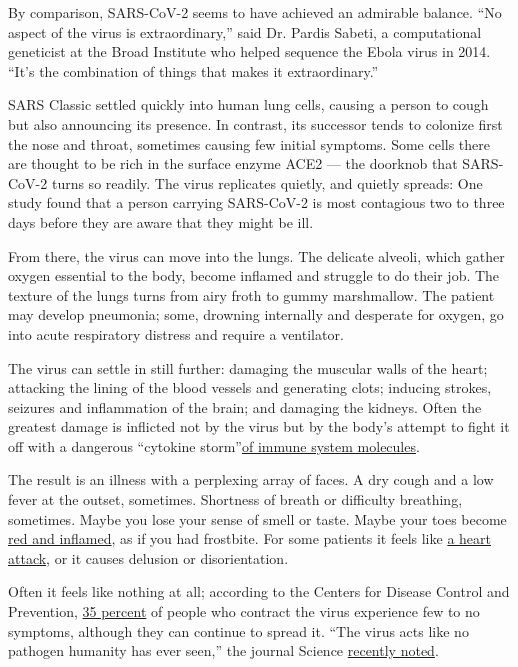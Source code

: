 By comparison, SARS-CoV-2 seems to have achieved an admirable balance.
``No aspect of the virus is extraordinary,'' said Dr. Pardis Sabeti, a
computational geneticist at the Broad Institute who helped sequence the
Ebola virus in 2014. ``It's the combination of things that makes it
extraordinary.''

SARS Classic settled quickly into human lung cells, causing a person to
cough but also announcing its presence. In contrast, its successor tends
to colonize first the nose and throat, sometimes causing few initial
symptoms. Some cells there are thought to be rich in the surface enzyme
ACE2 --- the doorknob that SARS-CoV-2 turns so readily. The virus
replicates quietly, and quietly spreads: One study found that a person
carrying SARS-CoV-2 is most contagious two to three days before they are
aware that they might be ill.

From there, the virus can move into the lungs. The delicate alveoli,
which gather oxygen essential to the body, become inflamed and struggle
to do their job. The texture of the lungs turns from airy froth to gummy
marshmallow. The patient may develop pneumonia; some, drowning
internally and desperate for oxygen, go into acute respiratory distress
and require a ventilator.

The virus can settle in still further: damaging the muscular walls of
the heart; attacking the lining of the blood vessels and generating
clots; inducing strokes, seizures and inflammation of the brain; and
damaging the kidneys. Often the greatest damage is inflicted not by the
virus but by the body's attempt to fight it off with a dangerous
``cytokine
storm''\href{https://www.nytimes3xbfgragh.onion/2020/04/01/health/coronavirus-cytokine-storm-immune-system.html}{of
immune system molecules}.

The result is an illness with a perplexing array of faces. A dry cough
and a low fever at the outset, sometimes. Shortness of breath or
difficulty breathing, sometimes. Maybe you lose your sense of smell or
taste. Maybe your toes become
\href{https://www.nytimes3xbfgragh.onion/2020/05/01/health/coronavirus-covid-toe.html}{red
and inflamed}, as if you had frostbite. For some patients it feels like
\href{https://www.sfgate.com/bayarea/article/Coronavirus-updates-COVID-19-Bay-Area-deaths-cases-15225947.phphttps://www.sfgate.com/bayarea/article/Coronavirus-updates-COVID-19-Bay-Area-deaths-cases-15225947.php}{a
heart attack}, or it causes delusion or disorientation.

Often it feels like nothing at all; according to the Centers for Disease
Control and Prevention,
\href{https://www.nytimes3xbfgragh.onion/2020/03/31/health/coronavirus-asymptomatic-transmission.htmlhttps://www.nytimes3xbfgragh.onion/2020/03/31/health/coronavirus-asymptomatic-transmission.html}{35
percent} of people who contract the virus experience few to no symptoms,
although they can continue to spread it. ``The virus acts like no
pathogen humanity has ever seen,'' the journal Science
\href{https://www.sciencemag.org/news/2020/04/how-does-coronavirus-kill-clinicians-trace-ferocious-rampage-through-body-brain-toes}{recently
noted}.

